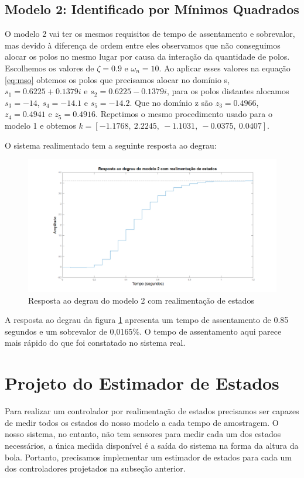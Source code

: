 \subsection{Modelo 2: Identificado por Mínimos Quadrados}

O modelo 2 vai ter os mesmos requisitos de tempo de assentamento e sobrevalor, mas devido à diferença de ordem entre eles observamos que não conseguimos alocar os polos no mesmo lugar por causa da interação da quantidade de polos. Escolhemos os valores de $\zeta=0.9$ e $\omega_n=10$. Ao aplicar esses valores na equação \eqref{eq:mso} obtemos os polos que precisamos alocar no domínio s, $s_1=0.6225 + 0.1379i$ e $s_2=0.6225 - 0.1379i$, para os polos distantes alocamos $s_3=-14$, $s_4=-14.1$ e $s_5=-14.2$. Que no domínio z são $z_3=0.4966$, $z_4=0.4941$ e $z_5=0.4916$. Repetimos o mesmo procedimento usado para o modelo 1 e obtemos $k=[-1.1768,~2.2245,~-1.1031,~-0.0375,~0.0407]$.


O sistema realimentado tem a seguinte resposta ao degrau:

\begin{figure}[H]
	\centering
	\includegraphics[width=1.1\linewidth]{respostadegraumodelo2realimentacao}
	\caption[Resposta ao degrau do modelo 2 com realimentação de estados]{Resposta ao degrau do modelo 2 com realimentação de estados}
	\label{fig:respostadegraumodelo2realimentacao}
\end{figure}

A resposta ao degrau da figura \ref{fig:respostadegraumodelo2realimentacao} apresenta um tempo de assentamento de 0.85 segundos e um sobrevalor de 0,0165\%. O tempo de assentamento aqui parece mais rápido do que foi constatado no sistema real.

\section{Projeto do Estimador de Estados}
Para realizar um controlador por realimentação de estados precisamos ser capazes de medir todos os estados do nosso modelo a cada tempo de amostragem. O nosso sistema, no entanto, não tem sensores para medir cada um dos estados necessários, a única medida disponível é a saída do sistema na forma da altura da bola. Portanto, precisamos implementar um estimador de estados para cada um dos controladores projetados na subseção anterior.

